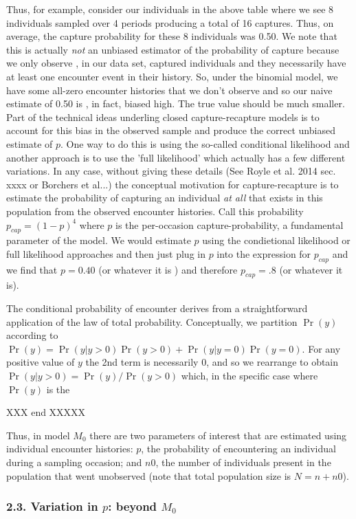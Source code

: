 \documentclass{book}
\begin{document}
Thus, for example, consider our individuals in the above table where
we see 8 individuals sampled over 4 periods producing a total of 16
captures. Thus, on average, the capture probability for these 8
individuals was 0.50. We note that this is actually {\it not} an
unbiased estimator of the probability of capture because we only
observe , in our data set, captured individuals and they necessarily
have at least one encounter event in their history. So, under the
binomial model, we have some all-zero encounter histories that we
don't observe and so our naive estimate of 0.50 is , in fact, biased
high. The true value should be much smaller. Part of the technical
ideas underling closed capture-recapture models is to account for this
bias in the observed sample and produce the correct unbiased estimate
of $p$. One way to do this is using the so-called conditional
likelihood and another approach is to use the 'full likelihood' which
actually has a few different variations.  In any case, without giving
these details (See Royle et al. 2014 sec. xxxx or Borchers et al...)
the conceptual motivation for capture-recapture is to estimate the
probability of capturing an individual {\it at all} that exists in
this population from the observed encounter histories.  Call this
probability $p_{cap} = (1-p)^4$ where $p$ is the per-occasion
capture-probability, a fundamental parameter of the model. We would
estimate $p$ using the condietional likelihood or full likelihood
approaches and then just plug in $p$ into the expression for $p_{cap}$
and we find that $p= 0.40$ (or whatever it is ) and therefore $p_{cap}
= .8$ (or whatever it is).

The conditional probability of encounter
 derives from a straightforward application of the law of total
probability. Conceptually, we partition $\Pr(y)$ according to
$\Pr(y) = \Pr(y|y>0)\Pr(y>0) + \Pr(y|y=0)\Pr(y=0)$. For any positive
value of $y$ the 2nd term is necessarily 0, and so we rearrange to
obtain
$\Pr(y|y>0) = \Pr(y)/\Pr(y>0)$ which, in the specific case where
$\Pr(y)$ is the

XXX end XXXXX

Thus, in model $M_0$ there are two parameters of interest that are
estimated using individual encounter histories: $p$, the probability
of encountering an individual during a sampling occasion; and $n0$,
the number of individuals present in the population that went
unobserved (note that total population size is $N = n + n0$).


\subsubsection*{2.3. Variation in $p$: beyond $M_0$}
\end{document}
